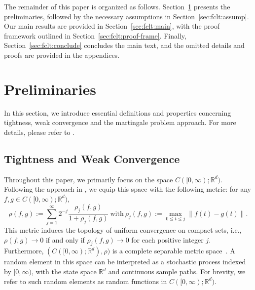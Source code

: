 \documentclass[11pt]{article}
\theoremstyle{plain}
\theoremstyle{definition}
\def\ermW{{\textnormal{W}}}
\def\ermX{{\textnormal{X}}}
\def\RB{{\mathbb R}}
\def\oprob{{{o}_P}}
\def\ooprob{{\mathcal{O}_P}}
\newcommand{\ssum}[3]{\sum\limits_{{#1}={#2}}^{#3}}
\def\weakconverge{\Rightarrow}
\begin{document}

The remainder of this paper is organized as follows. Section~\ref{sec:fclt:prelim} presents the preliminaries, followed by the necessary assumptions in Section~\ref{sec:fclt:assump}. Our main results are provided in Section~\ref{sec:fclt:main}, with the proof framework outlined in Section~\ref{sec:fclt:proof-frame}. Finally, Section~\ref{sec:fclt:conclude} concludes the main text, and the omitted details and proofs are provided in the appendices.











\section{Preliminaries}\label{sec:fclt:prelim}
In this section, we introduce essential definitions and properties concerning tightness, weak convergence and the martingale problem approach.
For more details, please refer to \cite{billingsley2013convergence, ethier2009markov}.

\subsection{Tightness and Weak Convergence}
\label{sec:fclt:prelim:tight}

Throughout this paper, we primarily focus on the space $C([0, \infty); \RB^d)$.
Following the approach in
\cite{whitt1970weak}, we equip this space with the following metric: for any $f,g \in C([0, \infty); \RB^d)$,
\begin{equation*}
	\rho (f, g) := \ssum{j}{1}{\infty} 2^{-j} \frac{\rho_j(f,g)}{1+\rho_j(f,g)} \ \text{with} \ 
	\rho_{j} (f, g) := \max_{0 \le t \le j} \| f(t) - g(t) \|.
\end{equation*}
This metric induces the topology of uniform convergence on compact sets, i.e., 
$\rho(f,g) \to 0$ if and only if $\rho_j (f,g) \to 0$ for each positive integer $j$.
Furthermore, $(C([0, \infty); \RB^d), \rho) $ is a complete separable metric space~\citep[Theorem~1]{whitt1970weak}.
A random element in this space can be interpreted as a stochastic process indexed by
$[0, \infty)$, with the state space $\RB^d$ and continuous sample paths. 
For brevity, we refer to such random elements as random functions in $C([0, \infty); \RB^d)$.
\end{document}
